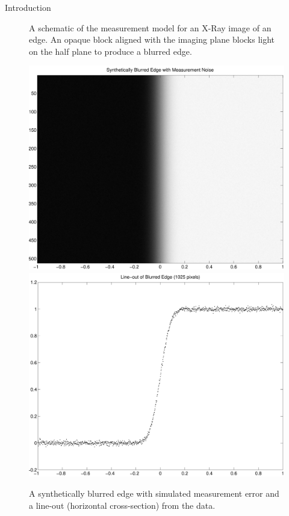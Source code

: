 \begin{chapter}{Introduction}
\begin{figure}
\begin{center}
\begin{tikzpicture}[scale=.8,every node/.style={minimum size=1cm},on grid]
    \end{tikzpicture}
  \caption{ A schematic of the measurement model for an X-Ray image of an edge. An opaque block aligned with the imaging plane blocks light on the half plane to produce a blurred edge.}\label{fig:edgePicture}
\end{center}
\end{figure}

\begin{figure}
\begin{center}
  \includegraphics[width=.45\textwidth]{figures/blurredEdgeData.pdf}
  \includegraphics[width=.45\textwidth]{figures/psfLineoutData.pdf}
  \caption{A synthetically blurred edge with simulated measurement error and a line-out (horizontal cross-section) from the data.} \label{fig:edgeData}
\end{center}
\end{figure}

\end{chapter}
